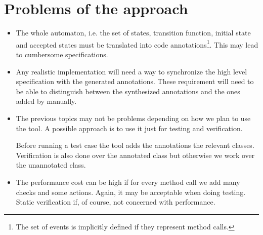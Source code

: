 \documentclass[a4paper,10pt]{article}
\begin{document}
\section{Problems of the approach}
\begin{itemize}
  \item The whole automaton, i.e. the set of states, transition function,
initial state and accepted states must be translated into code
annotations\footnote{The set of events is implicitly defined if they represent
method calls.}. This may lead to cumbersome specifications.
  \item Any realistic implementation will need a way to synchronize the high
level specification with the generated annotations. These requirement will need
to be able to distinguish between the synthesized annotations and the ones
added by manually.
  \item The previous topics may not be problems depending on how we plan to use
the tool. A possible approach is to use it just for testing and verification.

Before running a test case the tool adds the annotations the relevant classes.
Verification is also done over the annotated class but otherwise we work over
the unannotated class.
  \item The performance cost can be high if for every method call we add many
checks and some actions. Again, it may be acceptable when doing testing. Static
verification if, of course, not concerned with performance.
\end{itemize}



\end{document}
